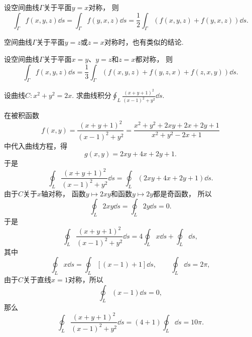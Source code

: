 设空间曲线\(\Gamma\)关于平面\(y=x\)对称，
则\begin{equation*}
	\int_\Gamma f(x,y,z) \dd{s}
	= \int_\Gamma f(y,x,z) \dd{s}
	= \frac12 \int_\Gamma (f(x,y,z) + f(y,x,z)) \dd{s}.
\end{equation*}

空间曲线\(\Gamma\)关于平面\(y=z\)或\(z=x\)对称时，也有类似的结论.

设空间曲线\(\Gamma\)关于平面\(x=y\)、\(y=z\)和\(z=x\)都对称，
则\begin{equation*}
	\int_\Gamma f(x,y,z) \dd{s}
	= \frac13 \int_\Gamma (f(x,y,z) + f(y,z,x) + f(z,x,y)) \dd{s}.
\end{equation*}

\begin{example}
设曲线\(C: x^2+y^2=2x\).
求曲线积分\(\oint_L \frac{(x+y+1)^2}{(x-1)^2+y^2} \dd{s}\).
\begin{solution}
在被积函数\begin{equation*}
	f(x,y) = \frac{(x+y+1)^2}{(x-1)^2+y^2}
	= \frac{x^2+y^2+2xy+2x+2y+1}{x^2+y^2-2x+1}
\end{equation*}中代入曲线方程，得\begin{equation*}
	g(x,y) = 2xy+4x+2y+1.
\end{equation*}
于是\begin{equation*}
	\oint_L \frac{(x+y+1)^2}{(x-1)^2+y^2} \dd{s}
	= \oint_L (2xy+4x+2y+1) \dd{s}.
\end{equation*}
由于\(C\)关于\(x\)轴对称，
函数\(y \mapsto 2xy\)和函数\(y \mapsto 2y\)都是奇函数，
所以\begin{equation*}
	\oint_L 2xy \dd{s}
	= \oint_L 2y \dd{s}
	= 0.
\end{equation*}
于是\begin{equation*}
	\oint_L \frac{(x+y+1)^2}{(x-1)^2+y^2} \dd{s}
	= 4 \oint_L x \dd{s} + \oint_L \dd{s},
\end{equation*}
其中\begin{equation*}
	\oint_L x \dd{s}
	= \oint_L [(x-1)+1] \dd{s},
	\qquad
	\oint_L \dd{s}
	= 2\pi,
\end{equation*}
由于\(C\)关于直线\(x=1\)对称，所以\begin{equation*}
	\oint_L (x-1) \dd{s}
	= 0,
\end{equation*}
那么\begin{equation*}
	\oint_L \frac{(x+y+1)^2}{(x-1)^2+y^2} \dd{s}
	= (4+1) \oint_L \dd{s}
	= 10\pi.
\end{equation*}
\end{solution}
\end{example}

